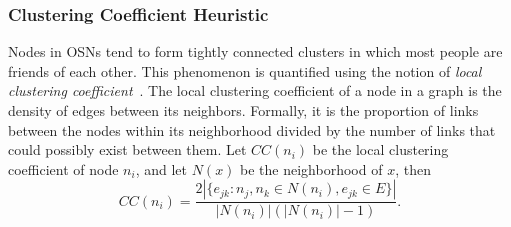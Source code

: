\documentclass[journal]{IEEEtran}
\begin{document}


\subsubsection{Clustering Coefficient Heuristic}
Nodes in OSNs tend to form tightly connected clusters in which most people are friends of each other. This phenomenon is quantified using the notion of {\em local clustering coefficient}~\cite{clustering}. 
The local clustering coefficient of a node in a graph is the density of edges between its neighbors. Formally, it is the proportion of links between the nodes within its neighborhood divided by the number of links that could possibly exist between them. 
Let $CC(n_i)$ be the local clustering coefficient of node $n_i$, and let $N(x)$ be the neighborhood of $x$, then
\begin{equation}
CC(n_i) = \frac{2|\{e_{jk}: n_j,n_k \in N(n_i), e_{jk} \in E\}|}{|N(n_i)|(|N(n_i)|-1)}.
\end{equation}
\end{document}
